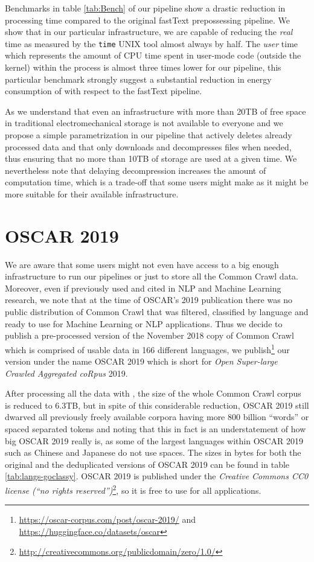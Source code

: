 Benchmarks in table \ref{tab:Bench} of our \goclassy pipeline show a drastic reduction in processing time compared to the original fastText prepossessing pipeline. We show that in our particular infrastructure, we are capable of reducing the \emph{real} time as measured by the \texttt{time} UNIX tool almost always by half. The \emph{user} time which represents the amount of CPU time spent in user-mode code (outside the kernel) within the process is almost three times lower for our \goclassy pipeline, this particular benchmark strongly suggest a substantial reduction in energy consumption of \goclassy with respect to the fastText pipeline.

As we understand that even an infrastructure with more than 20TB of free space in traditional electromechanical storage is not available to everyone and we propose a simple parametrization in our pipeline that actively deletes already processed data and that only downloads and decompresses files when needed, thus ensuring that no more than 10TB of storage are used at a given time. We nevertheless note that delaying decompression increases the amount of computation time, which is a trade-off that some users might make as it might be more suitable for their available infrastructure.

\section{OSCAR 2019}

We are aware that some users might not even have access to a big enough infrastructure to run our pipelines or just to store all the Common Crawl data. Moreover, even if previously used and cited in NLP and Machine Learning research, we note that at the time of OSCAR's 2019 publication there was no public distribution of Common Crawl that was filtered, classified by language and ready to use for Machine Learning or NLP applications. Thus we decide to publish a pre-processed version of the November 2018 copy of Common Crawl which is comprised of usable data in 166 different languages, we publish\footnote{\url{https://oscar-corpus.com/post/oscar-2019/} and \url{https://huggingface.co/datasets/oscar}} our version under the name OSCAR 2019 which is short for \emph{Open Super-large Crawled Aggregated coRpus} 2019.

After processing all the data with \goclassy, the size of the whole Common Crawl corpus is reduced to 6.3TB, but in spite of this considerable reduction, OSCAR 2019 still dwarved all previously freely available corpora having more 800 billion ``words'' or spaced separated tokens and noting that this in fact is an understatement of how big OSCAR 2019 really is, as some of the largest languages within OSCAR 2019 such as Chinese and Japanese do not use spaces. The sizes in bytes for both the original and the deduplicated versions of OSCAR 2019 can be found in table \ref{tab:langs-goclassy}. OSCAR 2019 is published under the \emph{Creative Commons CC0 license (``no rights reserved'')}\footnote{\url{http://creativecommons.org/publicdomain/zero/1.0/}}, so it is free to use for all applications.

